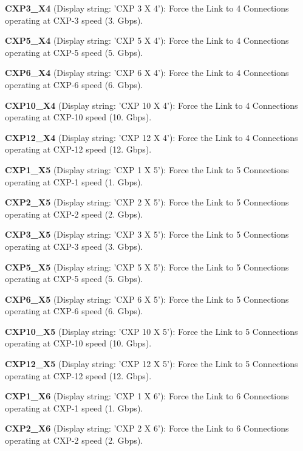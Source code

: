\begin{DoxyItemize}
\item {\bfseries C\+X\+P3\+\_\+\+X4} (Display string\+: 'C\+X\+P 3 X 4')\+: Force the Link to 4 Connections operating at C\+X\+P-\/3 speed (3. Gbps).
\item {\bfseries C\+X\+P5\+\_\+\+X4} (Display string\+: 'C\+X\+P 5 X 4')\+: Force the Link to 4 Connections operating at C\+X\+P-\/5 speed (5. Gbps).
\item {\bfseries C\+X\+P6\+\_\+\+X4} (Display string\+: 'C\+X\+P 6 X 4')\+: Force the Link to 4 Connections operating at C\+X\+P-\/6 speed (6. Gbps).
\item {\bfseries C\+X\+P10\+\_\+\+X4} (Display string\+: 'C\+X\+P 10 X 4')\+: Force the Link to 4 Connections operating at C\+X\+P-\/10 speed (10. Gbps).
\item {\bfseries C\+X\+P12\+\_\+\+X4} (Display string\+: 'C\+X\+P 12 X 4')\+: Force the Link to 4 Connections operating at C\+X\+P-\/12 speed (12. Gbps).
\item {\bfseries C\+X\+P1\+\_\+\+X5} (Display string\+: 'C\+X\+P 1 X 5')\+: Force the Link to 5 Connections operating at C\+X\+P-\/1 speed (1. Gbps).
\item {\bfseries C\+X\+P2\+\_\+\+X5} (Display string\+: 'C\+X\+P 2 X 5')\+: Force the Link to 5 Connections operating at C\+X\+P-\/2 speed (2. Gbps).
\item {\bfseries C\+X\+P3\+\_\+\+X5} (Display string\+: 'C\+X\+P 3 X 5')\+: Force the Link to 5 Connections operating at C\+X\+P-\/3 speed (3. Gbps).
\item {\bfseries C\+X\+P5\+\_\+\+X5} (Display string\+: 'C\+X\+P 5 X 5')\+: Force the Link to 5 Connections operating at C\+X\+P-\/5 speed (5. Gbps).
\item {\bfseries C\+X\+P6\+\_\+\+X5} (Display string\+: 'C\+X\+P 6 X 5')\+: Force the Link to 5 Connections operating at C\+X\+P-\/6 speed (6. Gbps).
\item {\bfseries C\+X\+P10\+\_\+\+X5} (Display string\+: 'C\+X\+P 10 X 5')\+: Force the Link to 5 Connections operating at C\+X\+P-\/10 speed (10. Gbps).
\item {\bfseries C\+X\+P12\+\_\+\+X5} (Display string\+: 'C\+X\+P 12 X 5')\+: Force the Link to 5 Connections operating at C\+X\+P-\/12 speed (12. Gbps).
\item {\bfseries C\+X\+P1\+\_\+\+X6} (Display string\+: 'C\+X\+P 1 X 6')\+: Force the Link to 6 Connections operating at C\+X\+P-\/1 speed (1. Gbps).
\item {\bfseries C\+X\+P2\+\_\+\+X6} (Display string\+: 'C\+X\+P 2 X 6')\+: Force the Link to 6 Connections operating at C\+X\+P-\/2 speed (2. Gbps).

\end{DoxyItemize}
